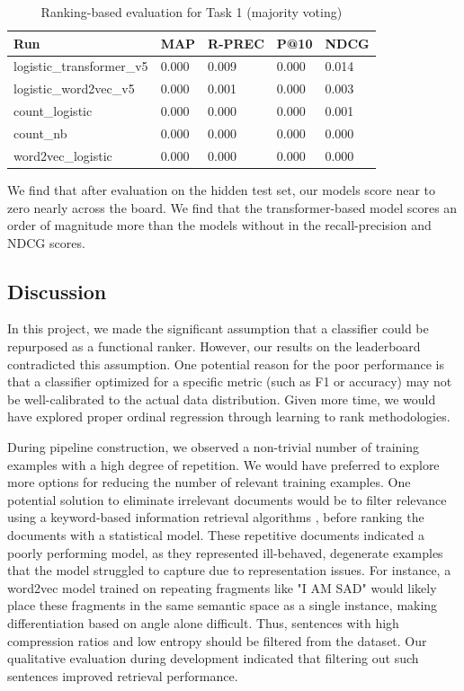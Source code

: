 \documentclass[]{style/ceurart}
\begin{document}
\begin{table}[]
\caption{Ranking-based evaluation for Task 1 (majority voting)}
\begin{tabular}{lllll}
\toprule
 Run                       & MAP   & R-PREC & P@10 & NDCG  \\
\midrule
 logistic\_transformer\_v5 & 0.000 & 0.009  & 0.000                             & 0.014 \\
 logistic\_word2vec\_v5    & 0.000 & 0.001  & 0.000                             & 0.003 \\
 count\_logistic           & 0.000 & 0.000  & 0.000                             & 0.001 \\
 count\_nb                 & 0.000 & 0.000  & 0.000                             & 0.000 \\
 word2vec\_logistic        & 0.000 & 0.000  & 0.000                             & 0.000 \\
 \bottomrule
\end{tabular}
\end{table}



We find that after evaluation on the hidden test set, our models score near to zero nearly across the board. We find that the transformer-based model scores an order of magnitude more than the models without in the recall-precision and NDCG scores. 

\subsection{Discussion}

In this project, we made the significant assumption that a classifier could be repurposed as a functional ranker. However, our results on the leaderboard contradicted this assumption. One potential reason for the poor performance is that a classifier optimized for a specific metric (such as F1 or accuracy) may not be well-calibrated to the actual data distribution. Given more time, we would have explored proper ordinal regression through learning to rank methodologies.

During pipeline construction, we observed a non-trivial number of training examples with a high degree of repetition. We would have preferred to explore more options for reducing the number of relevant training examples. One potential solution to eliminate irrelevant documents would be to filter relevance using a keyword-based information retrieval algorithms \cite{robertson_probabilistic_2009}, before ranking the documents with a statistical model. These repetitive documents indicated a poorly performing model, as they represented ill-behaved, degenerate examples that the model struggled to capture due to representation issues. For instance, a word2vec model trained on repeating fragments like "I AM SAD" would likely place these fragments in the same semantic space as a single instance, making differentiation based on angle alone difficult. Thus, sentences with high compression ratios and low entropy should be filtered from the dataset. Our qualitative evaluation during development indicated that filtering out such sentences improved retrieval performance.
\end{document}
